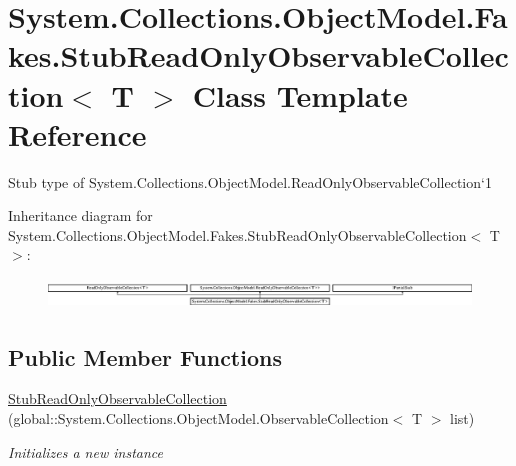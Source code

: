 \hypertarget{class_system_1_1_collections_1_1_object_model_1_1_fakes_1_1_stub_read_only_observable_collection_3_01_t_01_4}{\section{System.\-Collections.\-Object\-Model.\-Fakes.\-Stub\-Read\-Only\-Observable\-Collection$<$ T $>$ Class Template Reference}
\label{class_system_1_1_collections_1_1_object_model_1_1_fakes_1_1_stub_read_only_observable_collection_3_01_t_01_4}
}


Stub type of System.\-Collections.\-Object\-Model.\-Read\-Only\-Observable\-Collection`1 


Inheritance diagram for System.\-Collections.\-Object\-Model.\-Fakes.\-Stub\-Read\-Only\-Observable\-Collection$<$ T $>$\-:\begin{figure}[H]
\begin{center}
\leavevmode
\includegraphics[height=0.781032cm]{class_system_1_1_collections_1_1_object_model_1_1_fakes_1_1_stub_read_only_observable_collection_3_01_t_01_4}
\end{center}
\end{figure}
\subsection*{Public Member Functions}
\begin{DoxyCompactItemize}
\item 
\hyperlink{class_system_1_1_collections_1_1_object_model_1_1_fakes_1_1_stub_read_only_observable_collection_3_01_t_01_4_ae4be7b0408e26224794f338c1c7004bd}{Stub\-Read\-Only\-Observable\-Collection} (global\-::\-System.\-Collections.\-Object\-Model.\-Observable\-Collection$<$ T $>$ list)
\begin{DoxyCompactList}\small\item\em Initializes a new instance\end{DoxyCompactList}\end{DoxyCompactItemize}
